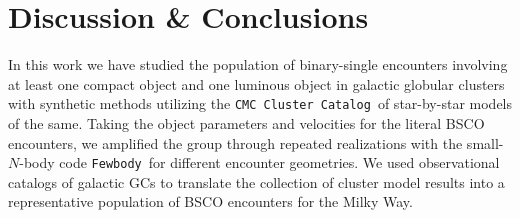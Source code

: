 \documentclass[twocolumn]{aastex631}
\newcommand{\kms}{${\rm km~s^{-1}}$}
\newcommand{\CMC}{\texttt{CMC}}
\newcommand{\CMCcat}{\texttt{CMC Cluster Catalog}}
\newcommand{\fewbody}{\texttt{Fewbody}}
\begin{document}

%

\section{Discussion \& Conclusions} \label{sec:disccon}

In this work we have studied the population of binary-single encounters involving at least one compact object and one luminous object in galactic globular clusters with synthetic methods utilizing the \CMCcat\ of star-by-star models of the same.
Taking the object parameters and velocities for the literal BSCO encounters, we amplified the group through repeated realizations with the small-$N$-body code \fewbody\ for different encounter geometries.
We used observational catalogs of galactic GCs to translate the collection of cluster model results into a representative population of BSCO encounters for the Milky Way.
\end{document}
